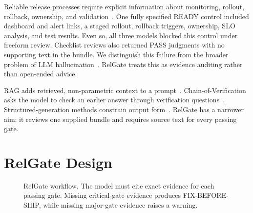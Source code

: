 \documentclass[conference]{IEEEtran}
\begin{document}
Reliable release processes require explicit information about monitoring, rollout, rollback, ownership, and validation~\cite{beyer2016sre,gunawi2016bugs}.
One fully specified READY control included dashboard and alert links, a staged rollout, rollback triggers, ownership, SLO analysis, and test results. Even so, all three models blocked this control under freeform review.
Checklist reviews also returned PASS judgments with no supporting text in the bundle. We distinguish this failure from the broader problem of LLM hallucination~\cite{huang2025hallucination}.
RelGate treats this as evidence auditing rather than open-ended advice.

RAG adds retrieved, non-parametric context to a prompt~\cite{lewis2020rag}.
Chain-of-Verification asks the model to check an earlier answer through verification questions~\cite{dhuliawala2024cove}.
Structured-generation methods constrain output form~\cite{tam2024format}.
RelGate has a narrower aim: it reviews one supplied bundle and requires source text for every passing gate.

\section{RelGate Design}

\begin{figure}[t]
\centering
{}
\caption{RelGate workflow. The model must cite exact evidence for each passing gate. Missing critical-gate evidence produces FIX-BEFORE-SHIP, while missing major-gate evidence raises a warning.}
\label{fig:arch}
\end{figure}
\end{document}
